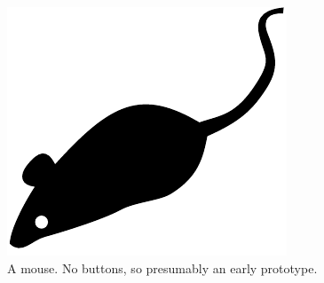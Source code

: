 \documentclass[american]{acmtog} %
\begin{document}
\begin{figure}
\centerline{\includegraphics[width=\columnwidth]{figures/tog-sample-mouse}}
\caption{A mouse. No buttons, so presumably an early prototype.}
    \label{fig:small-mouse}
\end{figure}

\end{document}
